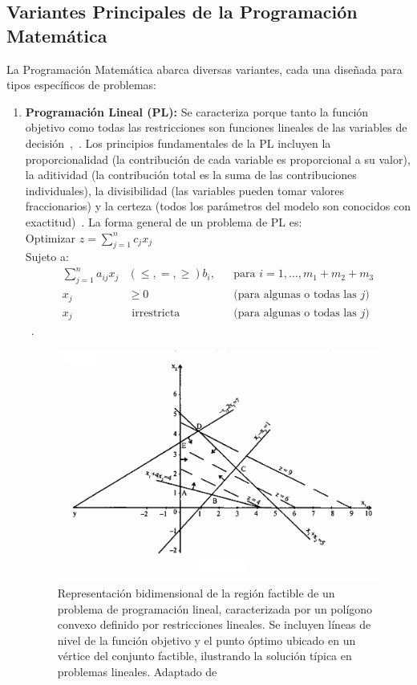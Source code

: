 \subsection{Variantes Principales de la Programación Matemática}

La Programación Matemática abarca diversas variantes, cada una diseñada para tipos específicos de problemas:

\begin{enumerate}[label=\arabic*.]
    \item \textbf{Programación Lineal (PL):}
    Se caracteriza porque tanto la función objetivo como todas las restricciones son funciones lineales de las variables de decisión~\cite[p.~2]{sinha2006},~\cite[p.~9]{bradley1977applied}. Los principios fundamentales de la PL incluyen la proporcionalidad (la contribución de cada variable es proporcional a su valor), la aditividad (la contribución total es la suma de las contribuciones individuales), la divisibilidad (las variables pueden tomar valores fraccionarios) y la certeza (todos los parámetros del modelo son conocidos con exactitud)~\cite[p.~9]{bradley1977applied}. La forma general de un problema de PL es: \\
    Optimizar $z = \sum_{j=1}^{n} c_j x_j$ \\
    Sujeto a:
    \begin{align*}
        \sum_{j=1}^{n} a_{ij} x_j & (\leq, =, \geq) b_i, && \text{para } i = 1, \ldots, m_1+m_2+m_3 \\
        x_j & \geq 0 && \text{(para algunas o todas las } j\text{)} \\ %
        x_j & \text{ irrestricta} && \text{(para algunas o todas las } j\text{)} %
    \end{align*}
~\cite[p.~117]{sinha2006}. \\
    \begin{figure}
        \centering
        \includegraphics[width=0.75\linewidth]{img/marcoTeorico/mathprogramming_fig1.png}
        \caption{Representación bidimensional de la región factible de un problema de programación lineal, caracterizada por un polígono convexo definido por restricciones lineales. Se incluyen líneas de nivel de la función objetivo y el punto óptimo ubicado en un vértice del conjunto factible, ilustrando la solución típica en problemas lineales. Adaptado de~\cite[p.~6-7]{sinha2006}}%
        \label{fig:mathprogramming01}
    \end{figure}


\end{enumerate}
